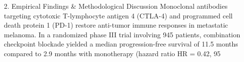 2. Empirical Findings & Methodological Discussion
Monoclonal antibodies targeting cytotoxic T-lymphocyte antigen 4 (CTLA-4) and programmed cell death protein 1 (PD-1) restore anti-tumor immune responses in metastatic melanoma. In a randomized phase III trial involving 945 patients, combination checkpoint blockade yielded a median progression-free survival of 11.5 months compared to 2.9 months with monotherapy (hazard ratio HR = 0.42, 95%